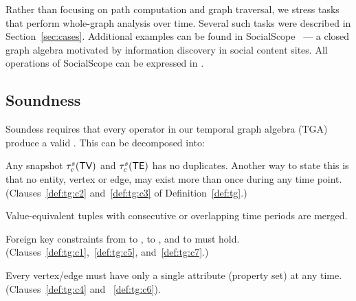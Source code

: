 Rather than focusing on path computation and graph traversal, we
stress tasks that perform whole-graph analysis over time.  Several
such tasks were described in Section~\ref{sec:cases}.  Additional
examples can be found in SocialScope~\cite{Amer-Yahia2009} --- a
closed graph algebra motivated by information discovery in social
content sites.  All operations of SocialScope can be expressed in
\ql. 

\subsection{Soundness}
\label{sec:algebra:integrity}


Soundess requires that every operator in our temporal graph algebra
(TGA) produce a valid \tg.  This can be decomposed into:

\begin{description}[noitemsep]

\item [R1: Duplicates] Any snapshot $\tau^s_c (\textsf{TV})$ and $\tau^s_c
  (\textsf{TE})$ has no duplicates.  Another way to state this is that no
  entity, vertex or edge, may exist more than once during any time
  point. (Clauses~\ref{def:tg:c2} and~\ref{def:tg:c3} of
  Definition~\ref{def:tg}.)

\item [R2: Coalesced] Value-equivalent tuples with
  consecutive or overlapping time periods are merged.

\item [R3: Foreign key constraint] Foreign key constraints from \tav
  to \tv, \tae to \te, and \te to \tv must
  hold. (Clauses~\ref{def:tg:c1},~\ref{def:tg:c5},
  and~\ref{def:tg:c7}.)

\item [R4: Single attribute] Every vertex/edge must have only a single
  attribute (property set) at any time. (Clauses~\ref{def:tg:c4} and
  ~\ref{def:tg:c6}).
\end{description}
\vspace{-1ex}

